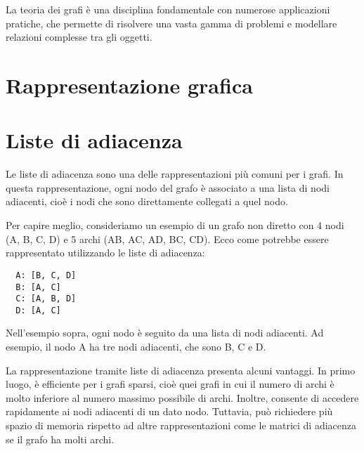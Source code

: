 La teoria dei grafi è una disciplina fondamentale con numerose applicazioni pratiche, che permette di risolvere una vasta gamma di problemi e modellare relazioni complesse tra gli oggetti.
\section{Rappresentazione grafica}
\begin{center}
\end{center}

\section{Liste di adiacenza}

Le liste di adiacenza sono una delle rappresentazioni più comuni per i grafi. In questa rappresentazione, ogni nodo del grafo è associato a una lista di nodi adiacenti, cioè i nodi che sono direttamente collegati a quel nodo.

Per capire meglio, consideriamo un esempio di un grafo non diretto con 4 nodi (A, B, C, D) e 5 archi (AB, AC, AD, BC, CD). Ecco come potrebbe essere rappresentato utilizzando le liste di adiacenza:

\begin{center}
  \begin{verbatim}
  A: [B, C, D]
  B: [A, C]
  C: [A, B, D]
  D: [A, C]
  \end{verbatim}
\end{center}
Nell'esempio sopra, ogni nodo è seguito da una lista di nodi adiacenti. Ad esempio, il nodo A ha tre nodi adiacenti, che sono B, C e D.

La rappresentazione tramite liste di adiacenza presenta alcuni vantaggi. In primo luogo, è efficiente per i grafi sparsi, cioè quei grafi in cui il numero di archi è molto inferiore al numero massimo possibile di archi. Inoltre, consente di accedere rapidamente ai nodi adiacenti di un dato nodo. Tuttavia, può richiedere più spazio di memoria rispetto ad altre rappresentazioni come le matrici di adiacenza se il grafo ha molti archi.

